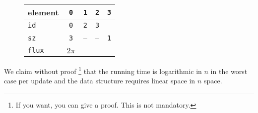 \documentclass{tufte-handout}
\begin{document}
 \begin{figure}[h]
   \begin{minipage}{3cm}
   \end{minipage}
  \qquad
   \begin{minipage}{4cm}
   \begin{tabular}{lcccc}
     element & \texttt{0} & \texttt{1} & \texttt{2} & \texttt{3} \\  \midrule
     \texttt{id}         & \texttt{0} & \texttt{2} & \texttt{3} \\
     \texttt{sz}         & \texttt{3} &  -- & -- & \texttt{1} \\
     \texttt{flux}    & $2\pi$ \\ 
   \end{tabular}
   \end{minipage}
 \end{figure}


 \medskip
  We claim without proof
  \footnote{If you want, you can give a proof. This is not mandatory.}
  that the running time is logarithmic in $n$ in the worst case per update and the data structure requires linear space in  $n$ space.
\end{document}

